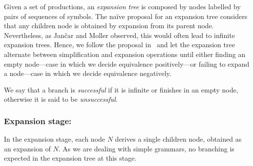 Given a set of productions, an \emph{expansion tree} is composed by nodes 
labelled by pairs of sequences of symbols. The na\"ive proposal for an
expansion tree considers that any children node is obtained by expansion 
from its parent node. Nevertheless, as Jan{\v{c}}ar and Moller 
observed, this would often lead to infinite expansion trees. Hence,
we follow the proposal in~\cite{janvcar1999techniques} and let the 
expansion tree alternate between simplification and expansion operations
until either finding an empty node---case in which we
decide equivalence positively---or failing to expand a node---case in
which we decide equivalence negatively.

We say that a branch
is \emph{successful} if it is infinite or finishes in an empty node, 
otherwise it is said to be \emph{unsuccessful}.

\subsubsection{Expansion stage:}
In the expansion stage, each node $N$ derives a single children node, 
obtained as an expansion of $N$. As we are dealing with simple grammars, 
no branching is expected in the expansion tree at this stage.

